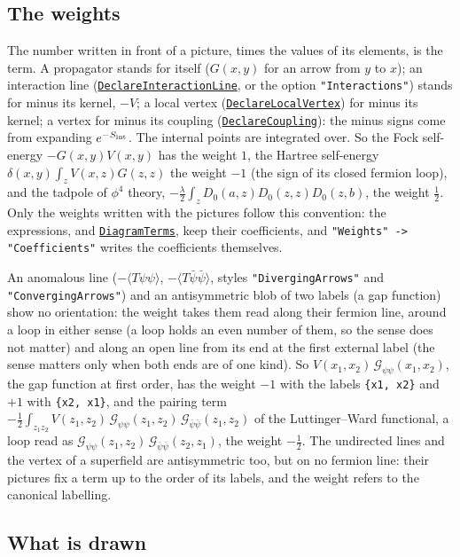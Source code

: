 \documentclass[11pt,a4paper]{article}
\newcommand{\pkg}[1]{\texttt{#1}}
\newcommand{\fnref}[1]{\hyperref[fn:#1]{\pkg{#1}}}
\newcommand{\opt}[1]{\texttt{"#1"}}
\begin{document}
\subsection{The weights}\label{sec:weights}

The number written in front of a picture, times the values of its elements, is the term. A propagator stands for itself
($G(x,y)$ for an arrow from $y$ to $x$); an interaction line (\fnref{DeclareInteractionLine}, or the option
\opt{Interactions}) stands for minus its kernel, $-V$; a local vertex (\fnref{DeclareLocalVertex}) for minus its kernel; a
vertex for minus its coupling (\fnref{DeclareCoupling}): the minus signs come from expanding $e^{-S_{\rm int}}$. The
internal points are integrated over. So the Fock self-energy $-G(x,y)V(x,y)$ has the weight $1$, the Hartree
self-energy $\delta(x,y)\int_zV(x,z)G(z,z)$ the weight $-1$ (the sign of its closed fermion loop), and the tadpole of $\phi^4$
theory, $-\frac\lambda2\int_zD_0(a,z)D_0(z,z)D_0(z,b)$, the weight $\frac12$. Only the weights written with the pictures
follow this convention: the expressions, and \fnref{DiagramTerms}, keep their coefficients, and \pkg{"Weights" ->
"Coefficients"} writes the coefficients themselves.

An anomalous line ($-\langle T\psi\psi\rangle$, $-\langle T\bar\psi\bar\psi\rangle$, styles \opt{DivergingArrows} and
\opt{ConvergingArrows}) and an antisymmetric blob of two labels (a gap function) show no orientation: the weight takes them
read along their fermion line, around a loop in either sense (a loop holds an even number of them, so the sense does not
matter) and along an open line from its end at the first external label (the sense matters only when both ends are of one
kind). So $V(x_1,x_2)\,\mathcal G_{\psi\psi}(x_1,x_2)$, the gap function at first order, has the weight $-1$ with the labels
\pkg{\{x1, x2\}} and $+1$ with \pkg{\{x2, x1\}}, and the pairing term $-\frac12\int_{z_1z_2}V(z_1,z_2)\,\mathcal G_{\psi\psi}(z_1,z_2)\,\mathcal
G_{\bar\psi\bar\psi}(z_1,z_2)$ of the Luttinger--Ward functional, a loop read as $\mathcal G_{\psi\psi}(z_1,z_2)\,\mathcal G_{\bar\psi\bar\psi}(z_2,z_1)$, the
weight $-\frac12$. The undirected lines and the vertex of a superfield are antisymmetric too, but on no fermion line: their
pictures fix a term up to the order of its labels, and the weight refers to the canonical labelling.

\subsection{What is drawn}
\end{document}
